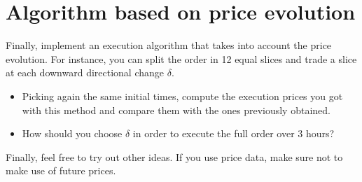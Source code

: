 \section{Algorithm based on price evolution}

Finally, implement an execution algorithm that takes into account the price evolution. For instance, you can split the order in 12 equal slices and trade a slice at each downward directional change $\delta$. 

\begin{itemize}
    \item Picking again the same initial times, compute the execution prices you got with this method and compare them with the ones previously obtained. 
    \item How should you choose $\delta$ in order to execute the full order over 3 hours?
\end{itemize}

\noindent Finally, feel free to try out other ideas. If you use price data, make sure not to make use of future prices. 
